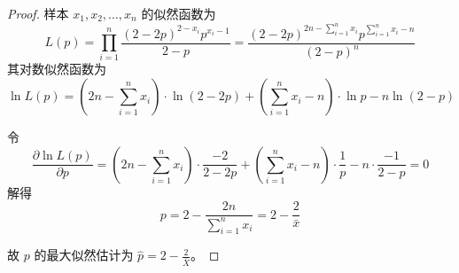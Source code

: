 \documentclass[normal,cn]{elegantnote}
\begin{document}
\begin{enumerate}
\begin{proof}
            样本 $x_{1},x_{2},\ldots,x_{n}$ 的似然函数为
            \begin{equation*}
                L(p)=\prod_{i=1}^{n}\frac{(2-2p)^{2-x_{i}}p^{x_{i}-1}}{2-p}=\frac{(2-2p)^{2n-\sum_{i=1}^{n}x_{i}}p^{\sum_{i=1}^{n}x_{i}-n}}{(2-p)^{n}}
            \end{equation*}
            其对数似然函数为
            \begin{equation*}
                \ln L(p)=\left(2 n-\sum_{i=1}^{n} x_{i}\right) \cdot \ln (2-2 p)+\left(\sum_{i=1}^{n} x_{i}-n\right) \cdot \ln p-n \ln (2-p)
            \end{equation*}

            令
            \begin{equation*}
                \frac{\partial\ln L(p)}{\partial p}=\left(2 n-\sum_{i=1}^{n} x_{i}\right) \cdot \frac{-2}{2-2 p}+\left(\sum_{i=1}^{n} x_{i}-n\right) \cdot \frac{1}{p}-n \cdot \frac{-1}{2-p}=0
            \end{equation*}
            解得
            \begin{equation*}
                p=2-\frac{2n}{\sum_{i=1}^{n}x_{i}}=2-\frac{2}{\bar{x}}
            \end{equation*}

            故 $p$ 的最大似然估计为 $\hat{p}=2-\frac{2}{\bar{X}}$。
        \end{proof}
\end{enumerate}
\end{document}

